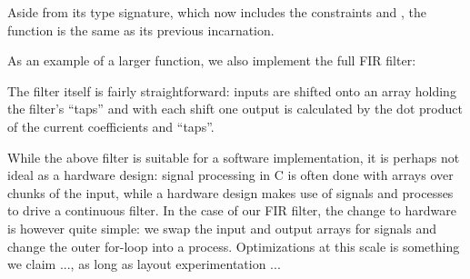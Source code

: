 \documentclass[../main.tex]{subfiles}
\begin{document}
\noindent Aside from its type signature, which now includes the constraints  and , the function is the same as its previous incarnation.

As an example of a larger function, we also implement the full FIR filter:


\noindent The filter itself is fairly straightforward: inputs are shifted onto an array holding the filter's ``taps'' and with each shift one output is calculated by the dot product of the current coefficients and ``taps''.

While the above filter is suitable for a software implementation, it is perhaps not ideal as a hardware design: signal processing in C is often done with arrays over chunks of the input, while a hardware design makes use of signals and processes to drive a continuous filter. In the case of our FIR filter, the change to hardware is however quite simple: we swap the input and output arrays for signals and change the outer for-loop into a process. Optimizations at this scale is something we claim ..., as long as layout experimentation ...





\end{document}
